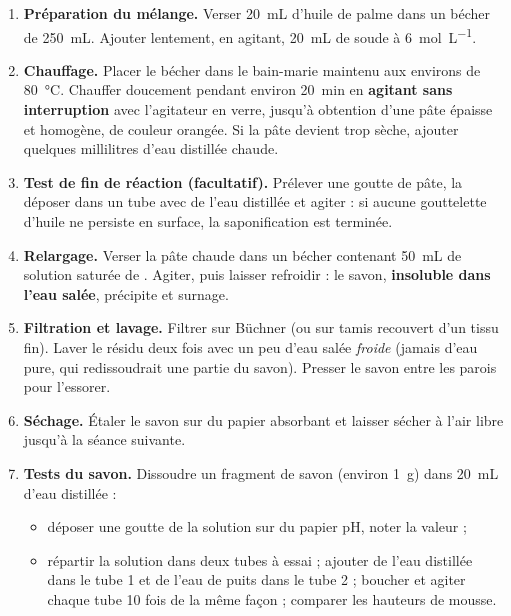 \documentclass[11pt]{article}
\newcounter{popsec}
\newcounter{popsub}
\newcommand{\courssub}[1]{%
  \stepcounter{popsub}%
  \par\vspace{9pt}\noindent{\popxbold\fontsize{11.5}{13}\selectfont\color{popink}{\color{poporange}\thepopsec.\thepopsub}\hspace{6pt}#1}\par\nopagebreak\vspace{4pt}
}
\begin{document}
\courssub{Protocole}

\begin{methode}
\begin{enumerate}
\item \textbf{Préparation du mélange.} Verser \SI{20}{mL} d'huile de palme dans un bécher de \SI{250}{mL}. Ajouter lentement, en agitant, \SI{20}{mL} de soude à \SI{6}{mol.L^{-1}}.
\item \textbf{Chauffage.} Placer le bécher dans le bain-marie maintenu aux environs de \SI{80}{\celsius}. Chauffer doucement pendant environ \SI{20}{min} en \textbf{agitant sans interruption} avec l'agitateur en verre, jusqu'à obtention d'une pâte épaisse et homogène, de couleur orangée. Si la pâte devient trop sèche, ajouter quelques millilitres d'eau distillée chaude.
\item \textbf{Test de fin de réaction (facultatif).} Prélever une goutte de pâte, la déposer dans un tube avec de l'eau distillée et agiter : si aucune gouttelette d'huile ne persiste en surface, la saponification est terminée.
\item \textbf{Relargage.} Verser la pâte chaude dans un bécher contenant \SI{50}{mL} de solution saturée de . Agiter, puis laisser refroidir : le savon, \textbf{insoluble dans l'eau salée}, précipite et surnage.
\item \textbf{Filtration et lavage.} Filtrer sur Büchner (ou sur tamis recouvert d'un tissu fin). Laver le résidu deux fois avec un peu d'eau salée \emph{froide} (jamais d'eau pure, qui redissoudrait une partie du savon). Presser le savon entre les parois pour l'essorer.
\item \textbf{Séchage.} Étaler le savon sur du papier absorbant et laisser sécher à l'air libre jusqu'à la séance suivante.
\item \textbf{Tests du savon.} Dissoudre un fragment de savon (environ \SI{1}{g}) dans \SI{20}{mL} d'eau distillée :
\begin{itemize}
\item déposer une goutte de la solution sur du papier pH, noter la valeur ;
\item répartir la solution dans deux tubes à essai ; ajouter de l'eau distillée dans le tube 1 et de l'eau de puits dans le tube 2 ; boucher et agiter chaque tube 10 fois de la même façon ; comparer les hauteurs de mousse.
\end{itemize}
\end{enumerate}
\end{methode}
\end{document}
